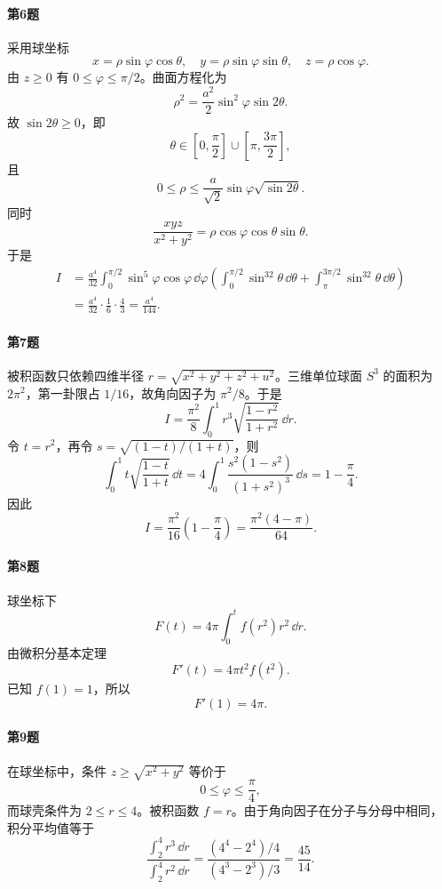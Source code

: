 \paragraph{第6题}
\begin{xsolution}
采用球坐标
\[
 x=\rho\sin\varphi\cos\theta,
 \quad y=\rho\sin\varphi\sin\theta,
 \quad z=\rho\cos\varphi.
\]
由 $z\ge0$ 有 $0\le\varphi\le\pi/2$。曲面方程化为
\[
 \rho^2=\frac{a^2}{2}\sin^2\varphi\sin2\theta.
\]
故 $\sin2\theta\ge0$，即
\[
 \theta\in\left[0,\frac\pi2\right]\cup
 \left[\pi,\frac{3\pi}{2}\right],
\]
且
\[
 0\le\rho\le\frac a{\sqrt2}\sin\varphi\sqrt{\sin2\theta}.
\]
同时
\[
 \frac{xyz}{x^2+y^2}=\rho\cos\varphi\cos\theta\sin\theta.
\]
于是
\begin{align*}
 I&=\frac{a^4}{32}
 \int_0^{\pi/2}\sin^5\varphi\cos\varphi\,\dd\varphi
 \left(
 \int_0^{\pi/2}\sin^32\theta\,\dd\theta+
 \int_\pi^{3\pi/2}\sin^32\theta\,\dd\theta
 \right)\\
 &=\frac{a^4}{32}\cdot\frac16\cdot\frac43
 =\boxed{\frac{a^4}{144}}.
\end{align*}
\end{xsolution}

\paragraph{第7题}
\begin{xsolution}
被积函数只依赖四维半径 $r=\sqrt{x^2+y^2+z^2+u^2}$。三维单位球面 $S^3$ 的面积为 $2\pi^2$，第一卦限占 $1/16$，故角向因子为 $\pi^2/8$。于是
\[
 I=\frac{\pi^2}{8}\int_0^1r^3
 \sqrt{\frac{1-r^2}{1+r^2}}\,\dd r.
\]
令 $t=r^2$，再令 $s=\sqrt{(1-t)/(1+t)}$，则
\[
 \int_0^1t\sqrt{\frac{1-t}{1+t}}\,\dd t
 =4\int_0^1\frac{s^2(1-s^2)}{(1+s^2)^3}\,\dd s
 =1-\frac\pi4.
\]
因此
\[
 \boxed{I=\frac{\pi^2}{16}\left(1-\frac\pi4\right)
 =\frac{\pi^2(4-\pi)}{64}}.
\]
\end{xsolution}

\paragraph{第8题}
\begin{xsolution}
球坐标下
\[
 F(t)=4\pi\int_0^t f(r^2)r^2\,\dd r.
\]
由微积分基本定理
\[
 F'(t)=4\pi t^2f(t^2).
\]
已知 $f(1)=1$，所以
\[
 \boxed{F'(1)=4\pi}.
\]
\end{xsolution}

\paragraph{第9题}
\begin{xsolution}
在球坐标中，条件 $z\ge\sqrt{x^2+y^2}$ 等价于
\[
 0\le\varphi\le\frac\pi4,
\]
而球壳条件为 $2\le r\le4$。被积函数 $f=r$。由于角向因子在分子与分母中相同，积分平均值等于
\[
 \frac{\int_2^4r^3\,\dd r}{\int_2^4r^2\,\dd r}
 =\frac{(4^4-2^4)/4}{(4^3-2^3)/3}
 =\boxed{\frac{45}{14}}.
\]
\end{xsolution}

